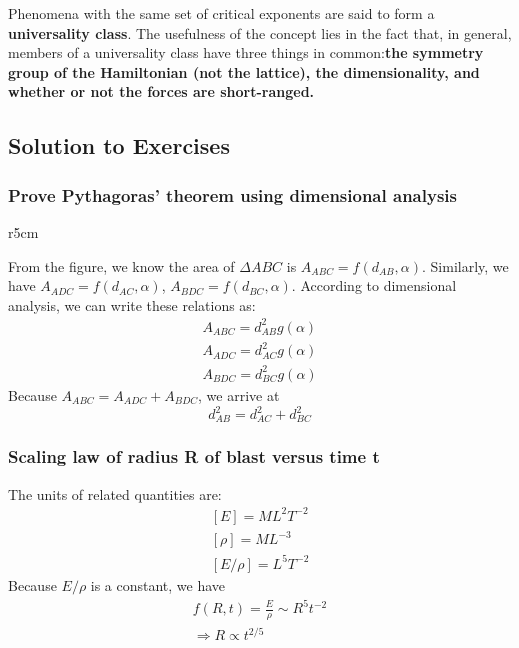 \documentclass[12pt,titlepage]{article}
\numberwithin{equation}{section}
\begin{document}
Phenomena with the same set of critical exponents are said to form a \textbf{universality class}. The usefulness of the concept lies in the fact that, in general, members of a universality class have three things in common:\textbf{the symmetry group of the Hamiltonian (not the lattice), the dimensionality, and whether or not the forces are short-ranged.}

\subsection{Solution to Exercises}
\subsubsection{Prove Pythagoras' theorem using dimensional analysis}
\begin{wrapfigure}{r}{5cm}
\end{wrapfigure}
From the figure, we know the area of $\Delta ABC$ is $A_{ABC}=f(d_{AB},\alpha)$. Similarly, we have $A_{ADC}=f(d_{AC},\alpha)$, $A_{BDC}=f(d_{BC},\alpha)$. According to dimensional analysis, we can write these relations as:
\begin{equation}
\begin{split}
    A_{ABC}=d^2_{AB}g(\alpha)\\
    A_{ADC}=d^2_{AC}g(\alpha)\\
    A_{BDC}=d^2_{BC}g(\alpha)
\end{split}
\end{equation}
Because $A_{ABC}=A_{ADC}+A_{BDC}$, we arrive at
\begin{equation}
    d^2_{AB}=d^2_{AC}+d^2_{BC}
\end{equation}

\subsubsection{Scaling law of radius R of blast versus time t}
The units of related quantities are:
\begin{equation}
\begin{split}
    [E]=ML^2T^{-2}\\
    [\rho] = ML^{-3}\\
    [E/\rho]=L^5T^{-2}
\end{split}
\end{equation}
Because $E/\rho$ is a constant, we have 
\begin{equation}
    \begin{split}
        f(R,t)=\frac{E}{\rho}\sim R^5t^{-2}\\
        \Rightarrow R\propto t^{2/5}
    \end{split}
\end{equation}
\end{document}
